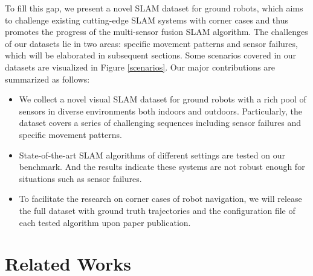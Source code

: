 \documentclass[conference]{IEEEtran}
\begin{document}
To fill this gap, we present a novel SLAM dataset for ground robots, which aims to challenge existing cutting-edge SLAM systems with corner cases and thus promotes the progress of the multi-sensor fusion SLAM algorithm.
The challenges of our datasets lie in two areas: specific movement patterns and sensor failures, which will be elaborated in subsequent sections. Some scenarios covered in our datasets are visualized in Figure \ref{scenarios}. Our major contributions are summarized as follows:

\begin{itemize}
	\item We collect a novel visual SLAM dataset for ground robots with a rich pool of sensors in diverse environments both indoors and outdoors. Particularly, the dataset covers a series of challenging sequences including sensor failures and specific movement patterns.
	\item  State-of-the-art SLAM algorithms of different settings are tested on our benchmark. And the results indicate these systems are not robust enough for situations such as sensor failures.
	\item To facilitate the research on corner cases of robot navigation, we will release the full dataset with ground truth trajectories and the configuration file of each tested algorithm upon paper publication.
\end{itemize}






\section{Related Works}
\end{document}
